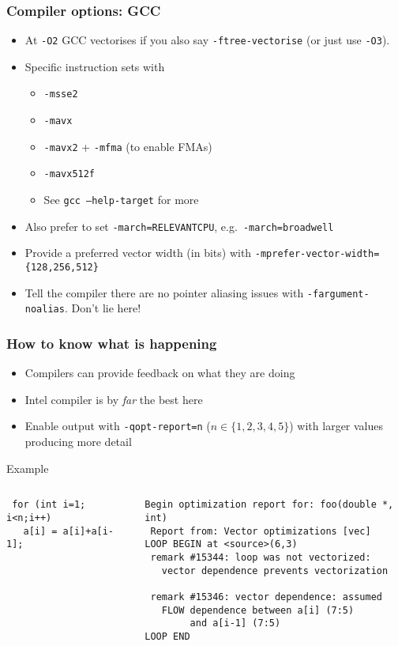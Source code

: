\documentclass[presentation,aspectratio=43,10pt]{beamer}
\begin{document}
\begin{frame}
  \frametitle{Compiler options: GCC}
  \begin{itemize}
  \item At \texttt{-O2} GCC vectorises if you also say
    \texttt{-ftree-vectorise} (or just use \texttt{-O3}).
  \item Specific instruction sets with
    \begin{itemize}
    \item \texttt{-msse2}
    \item \texttt{-mavx}

    \item \texttt{-mavx2} + \texttt{-mfma} (to enable FMAs)
    \item \texttt{-mavx512f}
    \item See \texttt{gcc --help-target} for more
    \end{itemize}
  \item Also prefer to set \texttt{-march=RELEVANTCPU},
    e.g.~\texttt{-march=broadwell}
  \item Provide a preferred vector width (in bits) with
    \texttt{-mprefer-vector-width=\{128,256,512\}}
  \item Tell the compiler there are no pointer aliasing issues with
    \texttt{-fargument-noalias}. Don't lie here!
  \end{itemize}
\end{frame}

\begin{frame}[fragile]
  \frametitle{How to know what is happening}
  \begin{itemize}
  \item Compilers can provide feedback on what they are doing
  \item Intel compiler is by \emph{far} the best here
  \item Enable output with \texttt{-qopt-report=n} ($n \in \{1, 2, 3,
    4, 5\}$) with larger values producing more detail
  \end{itemize}
\begin{exampleblock}{Example}
  \begin{columns}
    \begin{column}{0.3\textwidth}
\begin{verbatim}
 for (int i=1; i<n;i++)
   a[i] = a[i]+a[i-1];
\end{verbatim}
    \end{column}
    \begin{column}{0.6\textwidth}
\begin{verbatim}
Begin optimization report for: foo(double *, int)
 Report from: Vector optimizations [vec]
LOOP BEGIN at <source>(6,3)
 remark #15344: loop was not vectorized:
   vector dependence prevents vectorization

 remark #15346: vector dependence: assumed
   FLOW dependence between a[i] (7:5)
        and a[i-1] (7:5)
LOOP END
\end{verbatim}
    \end{column}
  \end{columns}
\end{exampleblock}
\end{frame}
\end{document}
